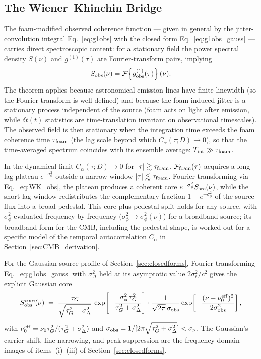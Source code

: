 \documentclass[aps,prd,onecolumn,amsmath,amssymb]{revtex4-2}
\begin{document}
\subsection{The Wiener--Khinchin Bridge}

The foam-modified observed coherence function — given in general by the
jitter-convolution integral Eq.~\eqref{eq:g1obs} with the closed form
Eq.~\eqref{eq:g1obs_gauss} — carries direct
spectroscopic content: for a stationary field the power spectral density
$S(\nu)$ and $g^{(1)}(\tau)$ are Fourier-transform pairs,
implying
\begin{equation}
  S_{\rm obs}(\nu) = \mathcal{F}\!\left\{g^{(1)}_{\rm obs}(\tau)\right\}(\nu).
  \label{eq:WK_obs}
\end{equation}
The theorem applies because astronomical emission lines have finite
linewidth (so the Fourier transform is well defined) and because the
foam-induced jitter is a stationary process independent of the source
(foam acts on light after emission, while $\delta t(t)$ statistics are
time-translation invariant on observational timescales).  The observed
field is then stationary when the integration time exceeds the foam
coherence time $\tau_{\rm foam}$ (the lag scale beyond which
$C_\alpha(\tau;D)\to 0$), so that the time-averaged spectrum coincides
with its ensemble average: $T_{\rm int}\gg\tau_{\rm foam}$.

In the dynamical limit $C_\alpha(\tau;D)\to 0$ for
$|\tau|\gtrsim\tau_{\rm foam}$, $\mathcal{F}_{\rm foam}(\tau)$ acquires
a long-lag plateau $e^{-\sigma_\phi^2}$ outside a narrow window
$|\tau|\lesssim\tau_{\rm foam}$.  Fourier-transforming via
Eq.~\eqref{eq:WK_obs}, the plateau produces a coherent core
$e^{-\sigma_\phi^2}S_{\rm src}(\nu)$, while the short-lag window
redistributes the complementary fraction $1-e^{-\sigma_\phi^2}$ of the
source flux into a broad pedestal.  This core-plus-pedestal split holds
for any source, with $\sigma_\phi^2$ evaluated frequency by frequency
($\sigma_\phi^2\to\sigma_\phi^2(\nu)$) for a broadband source; its
broadband form for the CMB, including the pedestal
shape, is worked out for a specific model of the temporal
autocorrelation $C_\alpha$ in Section~\ref{sec:CMB_derivation}.

For the Gaussian source profile of Section~\ref{sec:closedforms},
Fourier-transforming Eq.~\eqref{eq:g1obs_gauss} with $\sigma_\Delta^2$
held at its asymptotic value $2\sigma_\ell^2/c^2$ gives the explicit
Gaussian core
\begin{equation}
  S_{\rm obs}^{\rm core}(\nu) \;=\;
    \frac{\tau_G}{\sqrt{\tau_G^2+\sigma_\Delta^2}}\,
    \exp\!\left[-\frac{\sigma_\phi^2\,\tau_G^2}{\tau_G^2+\sigma_\Delta^2}\right]
    \cdot
    \frac{1}{\sqrt{2\pi}\,\sigma_{\rm obs}}
    \exp\!\left[-\frac{(\nu-\nu_0^{\rm eff})^2}{2\sigma_{\rm obs}^2}\right],
  \label{eq:Sobs_gauss}
\end{equation}
with $\nu_0^{\rm eff}=\nu_0\tau_G^2/(\tau_G^2+\sigma_\Delta^2)$ and
$\sigma_{\rm obs}=1/[2\pi\sqrt{\tau_G^2+\sigma_\Delta^2}]<\sigma_\nu$.
The Gaussian's carrier shift, line narrowing, and peak suppression are
the frequency-domain images of items~(i)--(iii) of
Section~\ref{sec:closedforms}.
\end{document}
